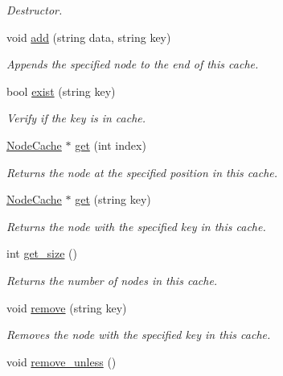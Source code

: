 \begin{DoxyCompactItemize}
\begin{DoxyCompactList}\small\item\em Destructor. \end{DoxyCompactList}\item 
void \hyperlink{classCache_a424082d73c3ce7e78fb9d122c1a826c8}{add} (string data, string key)
\begin{DoxyCompactList}\small\item\em Appends the specified node to the end of this cache. \end{DoxyCompactList}\item 
bool \hyperlink{classCache_a868817da5b0a1a877b1b090a292b2175}{exist} (string key)
\begin{DoxyCompactList}\small\item\em Verify if the key is in cache. \end{DoxyCompactList}\item 
\hyperlink{classNodeCache}{Node\+Cache} $\ast$ \hyperlink{classCache_a5c64b3fb5b170fb15e94295a9a3668f9}{get} (int index)
\begin{DoxyCompactList}\small\item\em Returns the node at the specified position in this cache. \end{DoxyCompactList}\item 
\hyperlink{classNodeCache}{Node\+Cache} $\ast$ \hyperlink{classCache_a31cbe65db89b7840d8baa1baeb3b5c39}{get} (string key)
\begin{DoxyCompactList}\small\item\em Returns the node with the specified key in this cache. \end{DoxyCompactList}\item 
int \hyperlink{classCache_a1cf0dcb3da4880aa34ecbcfaaaccff52}{get\+\_\+size} ()
\begin{DoxyCompactList}\small\item\em Returns the number of nodes in this cache. \end{DoxyCompactList}\item 
void \hyperlink{classCache_a46fc7cbf5d26176b8c4b98adf96c6c25}{remove} (string key)
\begin{DoxyCompactList}\small\item\em Removes the node with the specified key in this cache. \end{DoxyCompactList}\item 
void \hyperlink{classCache_a171169132c9a4383f87c31ae146bf51b}{remove\+\_\+unless} ()\hypertarget{classCache_a171169132c9a4383f87c31ae146bf51b}{}\label{classCache_a171169132c9a4383f87c31ae146bf51b}


\end{DoxyCompactItemize}
